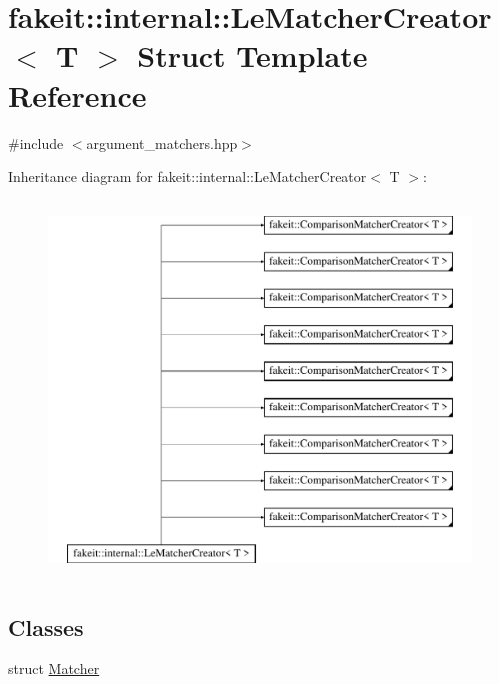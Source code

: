 \hypertarget{structfakeit_1_1internal_1_1LeMatcherCreator}{}\section{fakeit\+::internal\+::Le\+Matcher\+Creator$<$ T $>$ Struct Template Reference}
\label{structfakeit_1_1internal_1_1LeMatcherCreator}


{\ttfamily \#include $<$argument\+\_\+matchers.\+hpp$>$}

Inheritance diagram for fakeit\+::internal\+::Le\+Matcher\+Creator$<$ T $>$\+:\begin{figure}[H]
\begin{center}
\leavevmode
\includegraphics[height=10.000000cm]{structfakeit_1_1internal_1_1LeMatcherCreator}
\end{center}
\end{figure}
\subsection*{Classes}
\begin{DoxyCompactItemize}
\item 
struct \mbox{\hyperlink{structfakeit_1_1internal_1_1LeMatcherCreator_1_1Matcher}{Matcher}}
\end{DoxyCompactItemize}
